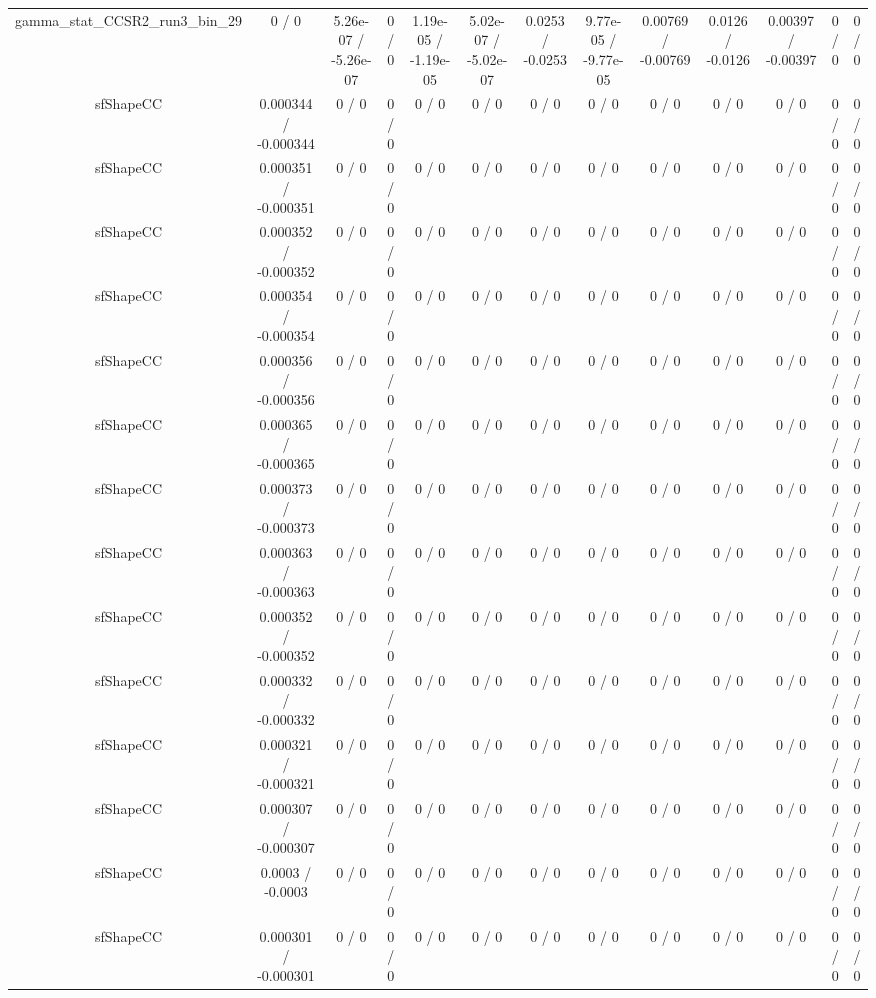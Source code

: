 \documentclass[10pt]{article}
\begin{document}
\begin{table}[htbp]
\begin{center}
\begin{tabular}{|c|c|c|c|c|c|c|c|c|c|c|c|c|}
  gamma_stat_CCSR2_run3_bin_29 & 0 / 0 & 5.26e-07 / -5.26e-07 & 0 / 0 & 1.19e-05 / -1.19e-05 & 5.02e-07 / -5.02e-07 & 0.0253 / -0.0253 & 9.77e-05 / -9.77e-05 & 0.00769 / -0.00769 & 0.0126 / -0.0126 & 0.00397 / -0.00397 & 0 / 0 & 0 / 0 \\ 
  sfShapeCC & 0.000344 / -0.000344 & 0 / 0 & 0 / 0 & 0 / 0 & 0 / 0 & 0 / 0 & 0 / 0 & 0 / 0 & 0 / 0 & 0 / 0 & 0 / 0 & 0 / 0 \\ 
  sfShapeCC & 0.000351 / -0.000351 & 0 / 0 & 0 / 0 & 0 / 0 & 0 / 0 & 0 / 0 & 0 / 0 & 0 / 0 & 0 / 0 & 0 / 0 & 0 / 0 & 0 / 0 \\ 
  sfShapeCC & 0.000352 / -0.000352 & 0 / 0 & 0 / 0 & 0 / 0 & 0 / 0 & 0 / 0 & 0 / 0 & 0 / 0 & 0 / 0 & 0 / 0 & 0 / 0 & 0 / 0 \\ 
  sfShapeCC & 0.000354 / -0.000354 & 0 / 0 & 0 / 0 & 0 / 0 & 0 / 0 & 0 / 0 & 0 / 0 & 0 / 0 & 0 / 0 & 0 / 0 & 0 / 0 & 0 / 0 \\ 
  sfShapeCC & 0.000356 / -0.000356 & 0 / 0 & 0 / 0 & 0 / 0 & 0 / 0 & 0 / 0 & 0 / 0 & 0 / 0 & 0 / 0 & 0 / 0 & 0 / 0 & 0 / 0 \\ 
  sfShapeCC & 0.000365 / -0.000365 & 0 / 0 & 0 / 0 & 0 / 0 & 0 / 0 & 0 / 0 & 0 / 0 & 0 / 0 & 0 / 0 & 0 / 0 & 0 / 0 & 0 / 0 \\ 
  sfShapeCC & 0.000373 / -0.000373 & 0 / 0 & 0 / 0 & 0 / 0 & 0 / 0 & 0 / 0 & 0 / 0 & 0 / 0 & 0 / 0 & 0 / 0 & 0 / 0 & 0 / 0 \\ 
  sfShapeCC & 0.000363 / -0.000363 & 0 / 0 & 0 / 0 & 0 / 0 & 0 / 0 & 0 / 0 & 0 / 0 & 0 / 0 & 0 / 0 & 0 / 0 & 0 / 0 & 0 / 0 \\ 
  sfShapeCC & 0.000352 / -0.000352 & 0 / 0 & 0 / 0 & 0 / 0 & 0 / 0 & 0 / 0 & 0 / 0 & 0 / 0 & 0 / 0 & 0 / 0 & 0 / 0 & 0 / 0 \\ 
  sfShapeCC & 0.000332 / -0.000332 & 0 / 0 & 0 / 0 & 0 / 0 & 0 / 0 & 0 / 0 & 0 / 0 & 0 / 0 & 0 / 0 & 0 / 0 & 0 / 0 & 0 / 0 \\ 
  sfShapeCC & 0.000321 / -0.000321 & 0 / 0 & 0 / 0 & 0 / 0 & 0 / 0 & 0 / 0 & 0 / 0 & 0 / 0 & 0 / 0 & 0 / 0 & 0 / 0 & 0 / 0 \\ 
  sfShapeCC & 0.000307 / -0.000307 & 0 / 0 & 0 / 0 & 0 / 0 & 0 / 0 & 0 / 0 & 0 / 0 & 0 / 0 & 0 / 0 & 0 / 0 & 0 / 0 & 0 / 0 \\ 
  sfShapeCC & 0.0003 / -0.0003 & 0 / 0 & 0 / 0 & 0 / 0 & 0 / 0 & 0 / 0 & 0 / 0 & 0 / 0 & 0 / 0 & 0 / 0 & 0 / 0 & 0 / 0 \\ 
  sfShapeCC & 0.000301 / -0.000301 & 0 / 0 & 0 / 0 & 0 / 0 & 0 / 0 & 0 / 0 & 0 / 0 & 0 / 0 & 0 / 0 & 0 / 0 & 0 / 0 & 0 / 0 \\ 

\end{tabular}
\end{center}
\end{table}
\end{document}
